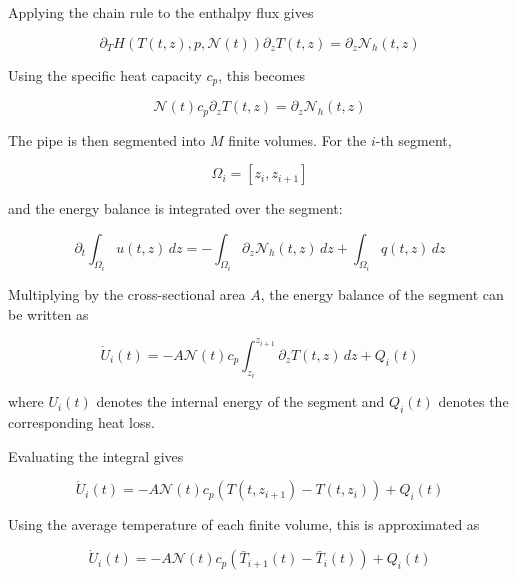 Applying the chain rule to the enthalpy flux gives

\begin{equation}
    \partial_T
    H
    \left(
        T(t,z),p,\mathcal{N}(t)
    \right)
    \partial_z T(t,z)
    =
    \partial_z \mathcal{N}_h(t,z)
\end{equation}

Using the specific heat capacity \(c_p\), this becomes

\begin{equation}
    \mathcal{N}(t)c_p
    \partial_z T(t,z)
    =
    \partial_z \mathcal{N}_h(t,z)
\end{equation}

The pipe is then segmented into \(M\) finite volumes. For the \(i\)-th
segment,

\begin{equation}
    \Omega_i
    =
    [z_i,z_{i+1}]
\end{equation}

and the energy balance is integrated over the segment:

\begin{equation}
    \partial_t
    \int_{\Omega_i}
    u(t,z)\,dz
    =
    -
    \int_{\Omega_i}
    \partial_z \mathcal{N}_h(t,z)\,dz
    +
    \int_{\Omega_i}
    q(t,z)\,dz
\end{equation}

Multiplying by the cross-sectional area \(A\), the energy balance of the
segment can be written as

\begin{equation}
    \dot{U}_i(t)
    =
    -
    A\mathcal{N}(t)c_p
    \int_{z_i}^{z_{i+1}}
    \partial_z T(t,z)\,dz
    +
    Q_i(t)
\end{equation}

where \(U_i(t)\) denotes the internal energy of the segment and \(Q_i(t)\)
denotes the corresponding heat loss.

Evaluating the integral gives

\begin{equation}
    \dot{U}_i(t)
    =
    -
    A\mathcal{N}(t)c_p
    \left(
        T(t,z_{i+1})
        -
        T(t,z_i)
    \right)
    +
    Q_i(t)
\end{equation}

Using the average temperature of each finite volume, this is approximated as

\begin{equation}
    \dot{U}_i(t)
    =
    -
    A\mathcal{N}(t)c_p
    \left(
        \bar{T}_{i+1}(t)
        -
        \bar{T}_i(t)
    \right)
    +
    Q_i(t)
\end{equation}

